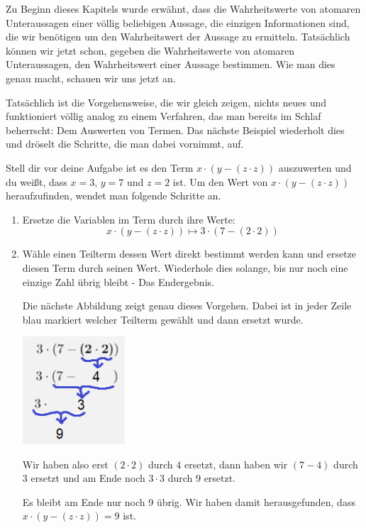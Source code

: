 \documentclass[../../main.tex]{subfiles}
\begin{document}
Zu Beginn dieses Kapitels wurde erwähnt, dass die Wahrheitswerte von atomaren Unteraussagen einer völlig beliebigen Aussage, die einzigen Informationen sind, die wir benötigen um den Wahrheitswert der Aussage zu ermitteln. Tatsächlich können wir jetzt schon, gegeben die Wahrheitswerte von atomaren Unteraussagen, den Wahrheitswert einer Aussage bestimmen. Wie man dies genau macht, schauen wir uns jetzt an.

Tatsächlich ist die Vorgehensweise, die wir gleich zeigen, nichts neues und funktioniert völlig analog zu einem Verfahren, das man bereits im Schlaf beherrscht: Dem Auswerten von Termen. Das nächste Beispiel wiederholt dies und dröselt die Schritte, die man dabei vornimmt, auf.

\begin{example}
Stell dir vor deine Aufgabe ist es den Term $x \cdot (y - (z \cdot z))$ auszuwerten und du weißt, dass $x = 3$, $y = 7$ und  $z = 2$ ist.
Um den Wert von $x \cdot (y - (z \cdot z))$ heraufzufinden, wendet man folgende Schritte an.
\begin{enumerate}
    \item Ersetze die Variablen im Term durch ihre Werte:
    \[x \cdot (y - (z \cdot z)) \longmapsto 3 \cdot (7 - (2 \cdot 2)) \]
    \item Wähle einen Teilterm dessen Wert direkt bestimmt werden kann und ersetze diesen Term durch seinen Wert. Wiederhole dies solange, bis nur noch eine einzige Zahl übrig bleibt - Das Endergebnis.
    
    Die nächste Abbildung zeigt genau dieses Vorgehen. Dabei ist in jeder Zeile blau markiert welcher Teilterm gewählt und dann ersetzt wurde.
    \begin{center}
        \includegraphics[width=0.3\textwidth]{images/TEMP_termalg.png}
    \end{center}
    Wir haben also erst $(2 \cdot 2)$ durch $4$ ersetzt, dann haben wir $(7-4)$ durch $3$ ersetzt und am Ende noch $3 \cdot 3$ durch 9 ersetzt.
    
    Es bleibt am Ende nur noch 9 übrig. Wir haben damit herausgefunden, dass $x \cdot (y - (z \cdot z)) = 9$ ist.
\end{enumerate}

\end{example}
\end{document}
